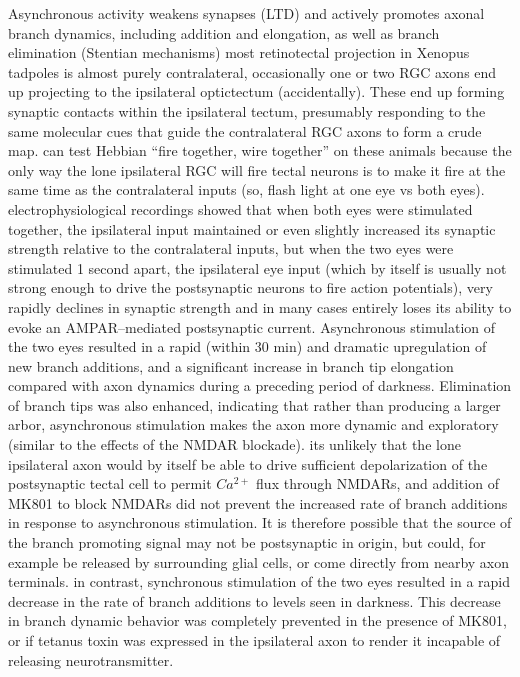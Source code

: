 \documentclass[11pt, a4paper, oneside]{article}   	%
\begin{document}
\begin{outline}
    \subpoint Asynchronous activity weakens synapses (LTD)  and actively promotes axonal branch dynamics, including addition and elongation, as well as branch elimination (Stentian mechanisms)
        \subsubpoint most retinotectal projection in Xenopus tadpoles is almost purely contralateral, occasionally one or two RGC axons end up projecting to the ipsilateral optictectum (accidentally). These end up forming synaptic contacts within the ipsilateral tectum, presumably responding to the same molecular cues that guide the contralateral RGC axons to form a crude map.
        \subsubpoint can test Hebbian ``fire together, wire together'' on these animals  because the only way the lone ipsilateral RGC will fire tectal neurons is to make it fire at the same time as the contralateral inputs (so, flash light at one eye vs both eyes).
        \subsubpoint electrophysiological recordings showed that when both eyes were stimulated together, the ipsilateral input maintained or even slightly increased its synaptic strength relative to the contralateral inputs, but when the two eyes were stimulated 1 second apart, the ipsilateral eye input (which by itself is usually not strong enough to drive the postsynaptic neurons to fire action potentials), very rapidly declines in synaptic strength and in many cases entirely loses its ability to evoke an AMPAR--mediated postsynaptic current.
        \subsubpoint Asynchronous stimulation of the two eyes resulted in a rapid (within 30 min) and dramatic upregulation of new branch additions, and a significant increase in branch tip elongation compared with axon dynamics during a preceding period of darkness. Elimination of branch tips was also enhanced, indicating that rather than producing a larger arbor, asynchronous stimulation makes the axon more dynamic and exploratory (similar to the effects of the NMDAR blockade).
          \supersubpoint its unlikely that the lone ipsilateral axon would by itself be able to drive sufficient depolarization of the postsynaptic tectal cell to permit $Ca^{2+}$ flux through NMDARs, and addition of MK801 to block NMDARs did not prevent the increased rate of branch additions in response to asynchronous stimulation. It is therefore possible that the source of the branch promoting signal may not be postsynaptic in origin, but could, for example be released by surrounding glial cells, or come directly from nearby axon terminals.
        \subsubpoint in contrast, synchronous stimulation of the two eyes resulted in a rapid decrease in the rate of branch additions to levels seen in darkness. This decrease in branch dynamic behavior was completely prevented in the presence of MK801, or if tetanus toxin was expressed in the ipsilateral axon to render it incapable of releasing neurotransmitter.

\end{outline}
\end{document}
